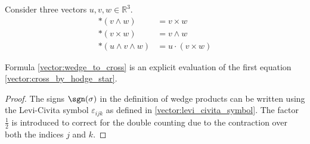     \begin{result}\label{vector:hodge_star_vectorcalculus}
        Consider three vectors $u,v,w\in\mathbb{R}^3$.
        \begin{align}
            \ast(v\wedge w) &= v\times w \label{vector:cross_by_hodge_star}\\
            \ast(v\times w) &= v\wedge w\\
            \ast(u\wedge v\wedge w) &= u\cdot(v\times w)
        \end{align}
    \end{result}
    \begin{remark}
        Formula \eqref{vector:wedge_to_cross} is an explicit evaluation of the first equation \eqref{vector:cross_by_hodge_star}.
        \begin{proof}
            The signs $\sgn(\sigma)$ in the definition of wedge products can be written using the Levi-Civita symbol $\varepsilon_{ijk}$ as defined in \ref{vector:levi_civita_symbol}. The factor $\frac{1}{2}$ is introduced to correct for the double counting due to the contraction over both the indices $j$ and $k$.
        \end{proof}
    \end{remark}

